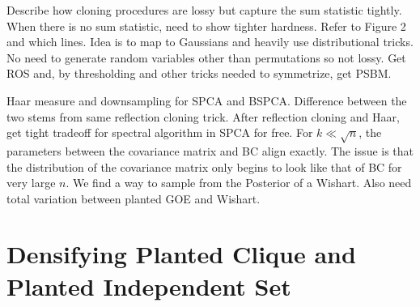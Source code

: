 \documentclass[11pt]{article}
\begin{document}
Describe how cloning procedures are lossy but capture the sum statistic tightly. When there is no sum statistic, need to show tighter hardness. Refer to Figure 2 and which lines. Idea is to map to Gaussians and heavily use distributional tricks. No need to generate random variables other than permutations so not lossy. Get ROS and, by thresholding and other tricks needed to symmetrize, get PSBM.

Haar measure and downsampling for SPCA and BSPCA. Difference between the two stems from same reflection cloning trick. After reflection cloning and Haar, get tight tradeoff for spectral algorithm in SPCA for free. For $k \ll \sqrt{n}$, the parameters between the covariance matrix and BC align exactly. The issue is that the distribution of the covariance matrix only begins to look like that of BC for very large $n$. We find a way to sample from the Posterior of a Wishart. Also need total variation between planted GOE and Wishart.

\section{Densifying Planted Clique and Planted Independent Set}

\end{document}
